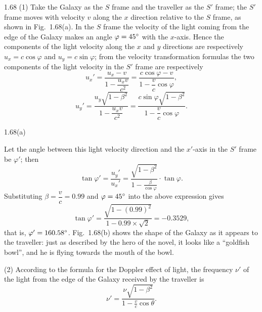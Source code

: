 \begin{solution}{1.68}
(1) Take the Galaxy as the $S$ frame and the traveller as the $S'$ frame; the $S'$ frame moves with velocity $v$ along the $x$ direction relative to the $S$ frame, as shown in Fig.~1.68(a). In the $S$ frame the velocity of the light coming from the edge of the Galaxy makes an angle $\varphi=45^{\circ}$ with the $x$-axis. Hence the components of the light velocity along the $x$ and $y$ directions are respectively $u_x=c\cos\varphi$ and $u_y=c\sin\varphi$; from the velocity transformation formulas the two components of the light velocity in the $S'$ frame are respectively
\[
u_x'=\frac{u_x-v}{1-\dfrac{u_xv}{c^2}}=\frac{c\cos\varphi-v}{1-\dfrac{v}{c}\cos\varphi},
\]
\[
u_y'=\frac{u_y\sqrt{1-\beta^2}}{1-\dfrac{u_xv}{c^2}}=\frac{c\sin\varphi\sqrt{1-\beta^2}}{1-\dfrac{v}{c}\cos\varphi}.
\]

\begin{figbox}{1.68(a)}
\end{figbox}

Let the angle between this light velocity direction and the $x'$-axis in the $S'$ frame be $\varphi'$; then
\[
\tan\varphi'=\frac{u_y'}{u_x'}=\frac{\sqrt{1-\beta^2}}{1-\frac{\beta}{\cos\varphi}}\cdot\tan\varphi.
\]
Substituting $\beta=\dfrac{v}{c}=0.99$ and $\varphi=45^{\circ}$ into the above expression gives
\[
\tan\varphi'=\frac{\sqrt{1-(0.99)^2}}{1-0.99\times\sqrt{2}}=-0.3529,
\]
that is, $\varphi'=160.58^{\circ}$. Fig.~1.68(b) shows the shape of the Galaxy as it appears to the traveller: just as described by the hero of the novel, it looks like a ``goldfish bowl'', and he is flying towards the mouth of the bowl.

(2) According to the formula for the Doppler effect of light, the frequency $\nu'$ of the light from the edge of the Galaxy received by the traveller is
\[
\nu'=\frac{\nu\sqrt{1-\beta^2}}{1-\frac{v}{c}\cos\theta}.
\]


\end{solution}
